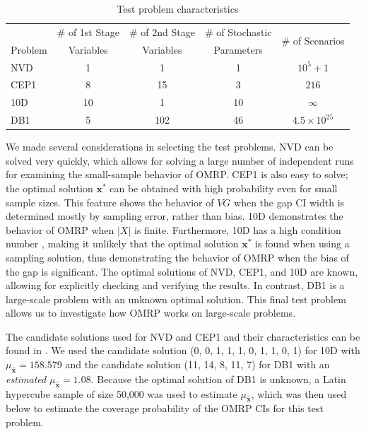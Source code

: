 \documentclass[12pt]{article}
\newcommand{\x}{\mathbf{x}}
\newcommand{\xh}{{\hat{\x}}}
\newcommand{\xs}{\x^*}
\begin{document}
\begin{table}[thb]
\centering
\footnotesize
\begin{tabular}{lcccc}
\hline
& \# of 1st Stage & \# of 2nd Stage & \# of Stochastic & \multirow{2}{*}{\# of Scenarios} \\
Problem & Variables & Variables & Parameters & \\
\cmidrule(r){1-1} \cmidrule(l){2-5}
NVD 	& 1     	& 1     	& 1   	& $10^5 + 1$ \\
CEP1 	& 8     	& 15   	& 3   	& $216$ \\
10D 	& 10     & 1     	& 10   	& $\infty$ \\
DB1 	& 5   	& 102   	& 46   	& $4.5\times 10^{25}$ \\
\hline
\end{tabular}
\caption{Test problem characteristics}
\label{tb:test_problems}
\end{table}



We made several considerations in selecting the test problems.
NVD can be solved very quickly, which allows for solving a large number of independent runs for examining the small-sample behavior of OMRP.
CEP1 is also easy to solve; the optimal solution $\xs$ can be obtained with high probability even for small sample sizes.
This feature shows the behavior of $VG$ when the gap CI width is determined mostly by sampling error, rather than bias.
10D demonstrates the behavior of OMRP when $|X|$ is finite.
Furthermore, 10D has a high condition number \citep{kleywegt2002sample}, making it unlikely that the optimal solution $\xs$ is found when using a sampling solution, thus demonstrating the behavior of OMRP when the bias of the gap is significant.
The optimal solutions of NVD, CEP1, and 10D are known, allowing for explicitly checking and verifying the results.
In contrast, DB1 is a large-scale problem with an unknown optimal solution.
This final test problem allows us to investigate how OMRP works on large-scale problems.


The candidate solutions used for NVD and CEP1 and their characteristics can be found in \citep{Bayraksan2006}.
We used the candidate solution (0, 0, 1, 1, 1, 0, 1, 1, 0, 1) for 10D with $\mu_{\xh} = 158.579$ and the candidate solution (11, 14, 8, 11, 7) for DB1 with an {\it estimated} $\mu_{\xh} = 1.08$. 
Because the optimal solution of DB1 is unknown, a Latin hypercube sample of size 50,000 was used to estimate $\mu_{\xh}$, which was then used below to estimate the coverage probability of the OMRP CIs for this test problem.
\end{document}
